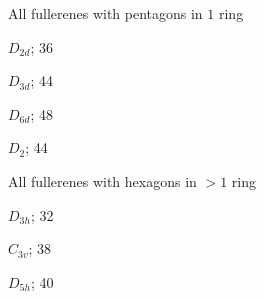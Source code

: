 \documentclass[%
pdf,
colorBG,
slideColor,
]{prosper}
\begin{document}
\begin{slide}{All fullerenes with pentagons in $1$ ring}

\begin{center}
\begin{minipage}{5cm}
\centering
{}\par
$D_{2d}$; 36
\end{minipage}
\begin{minipage}{5cm}
\centering
{}\par
$D_{3d}$; 44
\end{minipage}
\begin{minipage}{5cm}
\centering
{}\par
$D_{6d}$; 48
\end{minipage}
\begin{minipage}{5cm}
\centering
{}\par
$D_2$; 44
\end{minipage}
\end{center}
\end{slide}




\begin{slide}{All fullerenes with hexagons in $>1$ ring}

\begin{center}
\begin{minipage}[b]{35mm}
\centering
{}\par
$D_{3h}$; 32
\end{minipage}
\begin{minipage}[b]{35mm}
\centering
{}\par
$C_{3v}$; 38
\end{minipage}
\begin{minipage}[b]{35mm}
\centering
{}\par
$D_{5h}$; 40
\end{minipage}
\end{center}

\end{slide}
\end{document}

